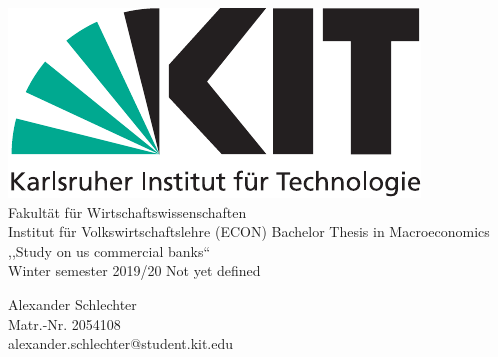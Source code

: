 \documentclass[12pt, a4paper]{article} %
\begin{document}

\begin{titlepage}
\begin{center}
\includegraphics[scale=0.65]{KITlogo}\\
\large
Fakultät für Wirtschaftswissenschaften\\
Institut für Volkswirtschaftslehre (ECON)
\vfill{
\Large
Bachelor Thesis in Macroeconomics\\\vspace{0.5cm}
,,Study on us commercial banks``\\\vspace{0.5cm}
Winter semester 2019/20%
}
\vfill{
\LARGE
Not yet defined
\\ 
\vspace{0.5cm}
\normalsize
}
\end{center}

\vfill{
\normalsize
\noindent Alexander Schlechter \\
Matr.-Nr. 2054108 \\
alexander.schlechter@student.kit.edu}
\end{titlepage}
\newpage

\end{document}
